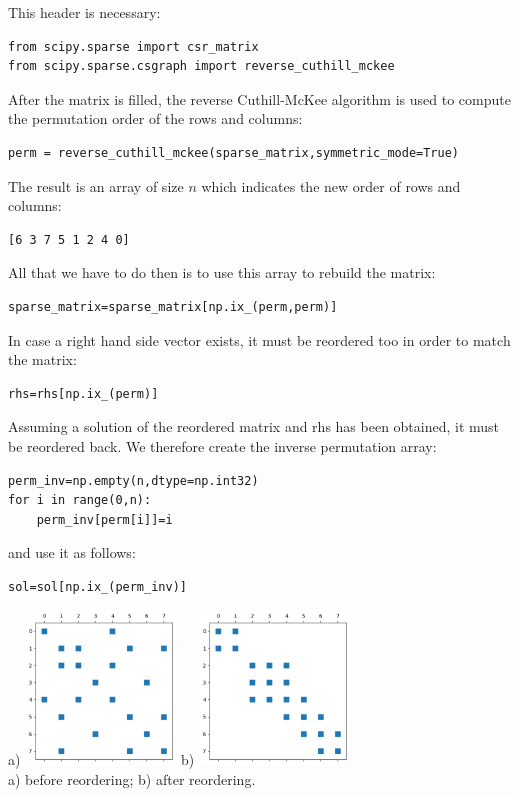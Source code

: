 This header is necessary:
\begin{lstlisting}
from scipy.sparse import csr_matrix
from scipy.sparse.csgraph import reverse_cuthill_mckee
\end{lstlisting}
After the matrix is filled, the reverse Cuthill-McKee algorithm is used to compute the 
permutation order of the rows and columns:
\begin{lstlisting}
perm = reverse_cuthill_mckee(sparse_matrix,symmetric_mode=True)
\end{lstlisting}
The result is an array of size $n$ which indicates the new order of rows and columns:
\begin{lstlisting}
[6 3 7 5 1 2 4 0]
\end{lstlisting}
All that we have to do then is to use this array to rebuild the matrix:
\begin{lstlisting}
sparse_matrix=sparse_matrix[np.ix_(perm,perm)]
\end{lstlisting}
In case a right hand side vector exists, it must be reordered too in order to match the matrix:
\begin{lstlisting}
rhs=rhs[np.ix_(perm)]
\end{lstlisting}
Assuming a solution of the reordered matrix and rhs has been obtained, it must be reordered back.
We therefore create the inverse permutation array:
\begin{lstlisting}
perm_inv=np.empty(n,dtype=np.int32)
for i in range(0,n):
    perm_inv[perm[i]]=i
\end{lstlisting}
and use it as follows:
\begin{lstlisting}
sol=sol[np.ix_(perm_inv)]
\end{lstlisting}


\begin{center}
a) \includegraphics[width=4cm]{images/reordering/matrix_bef}
b) \includegraphics[width=4cm]{images/reordering/matrix_aft}\\
{\captionfont a) before reordering; b) after reordering.}
\end{center}

